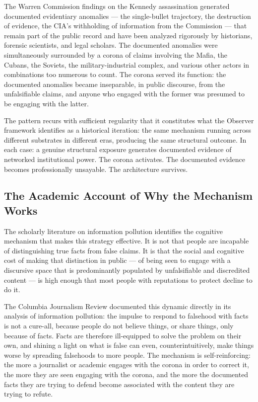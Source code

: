 \documentclass[11pt,a4paper]{article}
\begin{document}
The Warren Commission findings on the Kennedy assassination generated documented evidentiary anomalies — the single-bullet trajectory, the destruction of evidence, the CIA's withholding of information from the Commission — that remain part of the public record and have been analyzed rigorously by historians, forensic scientists, and legal scholars. The documented anomalies were simultaneously surrounded by a corona of claims involving the Mafia, the Cubans, the Soviets, the military-industrial complex, and various other actors in combinations too numerous to count. The corona served its function: the documented anomalies became inseparable, in public discourse, from the unfalsifiable claims, and anyone who engaged with the former was presumed to be engaging with the latter.


The pattern recurs with sufficient regularity that it constitutes what the Observer framework identifies as a historical iteration: the same mechanism running across different substrates in different eras, producing the same structural outcome. In each case: a genuine structural exposure generates documented evidence of networked institutional power. The corona activates. The documented evidence becomes professionally unsayable. The architecture survives.


\subsection{The Academic Account of Why the Mechanism Works}

The scholarly literature on information pollution identifies the cognitive mechanism that makes this strategy effective. It is not that people are incapable of distinguishing true facts from false claims. It is that the social and cognitive cost of making that distinction in public — of being seen to engage with a discursive space that is predominantly populated by unfalsifiable and discredited content — is high enough that most people with reputations to protect decline to do it.


The Columbia Journalism Review documented this dynamic directly in its analysis of information pollution: the impulse to respond to falsehood with facts is not a cure-all, because people do not believe things, or share things, only because of facts. Facts are therefore ill-equipped to solve the problem on their own, and shining a light on what is false can even, counterintuitively, make things worse by spreading falsehoods to more people. The mechanism is self-reinforcing: the more a journalist or academic engages with the corona in order to correct it, the more they are seen engaging with the corona, and the more the documented facts they are trying to defend become associated with the content they are trying to refute.
\end{document}
